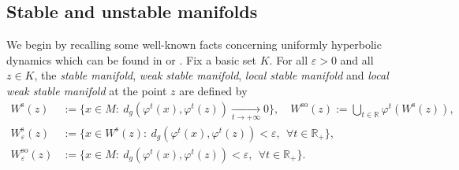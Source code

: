 \documentclass[JEP,XML,SOM,Unicode,NoEqCountersInSection,NoFloatCountersInSection,published]{cedram}
\newcommand{\rs}{\mathrm{s}}
\newcommand{\rso}{\mathrm{so}}
\theoremstyle{definition}
\theoremstyle{plain}
\newcommand{\R}{\mathbb{R}}
\begin{document}
\subsection{Stable and unstable manifolds} We begin by recalling some well-known facts concerning uniformly hyperbolic dynamics which can be found in \cite{katok-hasselblatt} or \cite{dyatlov}. Fix a basic set $K$. For all $\varepsilon > 0$ and all $z \in K$, the \textit{stable manifold}, \textit{weak stable manifold}, \textit{local stable manifold} and \textit{local weak stable manifold} at the point $z$ are defined by
\begin{align*}
W^\rs (z) &:= \{ x \in M: \: d_g(\varphi^t(x), \varphi^t(z)) \underset{t \to+\infty}{\to} 0 \}, \quad W^{\rso} (z):= \bigcup_{t \in \R} \varphi^t \left(W^\rs (z) \right), \\
W_{\varepsilon}^\rs (z) &:= \{ x \in W^\rs (z): \: d_g(\varphi^t(x), \varphi^t(z)) < \varepsilon, \: \: \forall t \in \R_+ \},\\
W_{\varepsilon}^{\rso} (z) &:= \{ x \in M: \: d_g(\varphi^t(x), \varphi^t(z)) < \varepsilon, \: \: \forall t \in \R_+ \}.
\end{align*}
\end{document}
